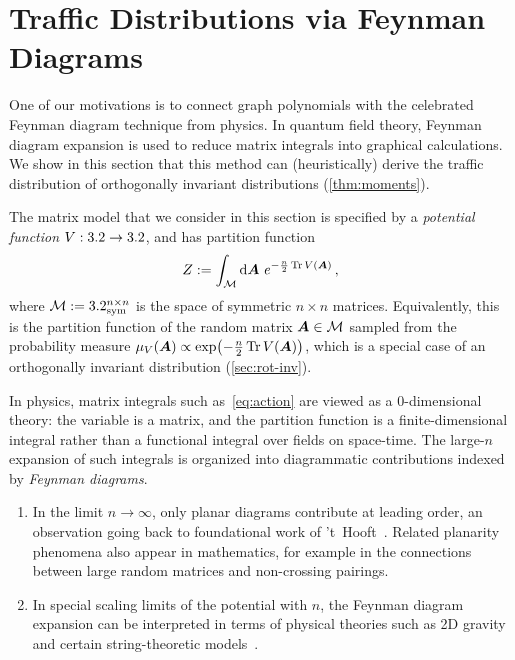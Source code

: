 \newpage
\section{Traffic Distributions via Feynman Diagrams}
\label{sec:feynman-physics}

One of our motivations is to connect graph polynomials with the celebrated Feynman diagram technique from physics.
In quantum field theory, Feynman diagram expansion is used to reduce matrix integrals into graphical calculations.
We show in this section that this method can (heuristically) derive the traffic distribution of orthogonally invariant distributions (\cref{thm:moments}).

The matrix model that we consider in this section is specified by a {\em potential
function} $V:3.2\to3.2$, and has partition function
\begin{equation}\label{eq:action}
    Z := \int_{\mathcal M}{\textnormal d}{\bm A}\ e^{-\frac n2\Tr V({\bm A})}\,,
\end{equation}
where $\mathcal M := 3.2^{n\times n}_{\mathrm{sym}}$ is the space of symmetric $n\times n$
matrices. Equivalently, this is the partition function of the random matrix
${\bm A}\in\mathcal M$ sampled from the probability measure
$\mu_V({\bm A})\propto \exp(-\frac n2\Tr V({\bm A}))$, which is a special case of an
orthogonally invariant distribution (\cref{sec:rot-inv}).

In physics, matrix integrals such as~\cref{eq:action} are viewed as a
$0$-dimensional theory: the variable is a matrix, and the partition
function is a finite-dimensional integral rather than a functional integral over
fields on space-time. The large-$n$ expansion of such integrals is organized into diagrammatic
contributions indexed by {\em Feynman diagrams}.
\begin{enumerate}
    \item In the limit $n\to\infty$, only planar diagrams contribute at leading
    order, an observation going back to foundational work of 't~Hooft~\cite{tHooft1974planar, brezin1978planar}. Related planarity phenomena also appear in
    mathematics, for example in the connections between large random matrices and
    non-crossing pairings.

    \item In special scaling limits of the potential
    with $n$, the Feynman diagram expansion can be interpreted in terms of physical theories such as 2D
    gravity and certain string-theoretic models~\cite{diFrancesco1995gravity, cotler2017black, saad2019jt}.
\end{enumerate}

